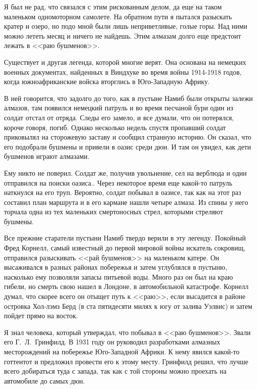 \documentclass[12pt,a4paper,twoside,openany,svgnames]{memoir}
\begin{document}
Я был не рад, что связался с этим рискованным делом, да еще на таком маленьком одномоторном самолете. На обратном пути я пытался разыскать кратер и озеро, но подо мной были лишь неприветливые, голые горы. Над ними можно лететь месяц и ничего не найдешь. Этим алмазам долго еще предстоит лежать в <<раю бушменов>>.

Существует и другая легенда, которой многие верят. Она основана на немецких военных документах, найденных в Виндхуке во время войны 1914-1918 годов, когда южноафриканские войска вторглись в Юго-Западную Африку.

В ней говорится, что задолго до того, как в пустыне Намиб были открыты залежи алмазов, там появился немецкий патруль и во время песчаной бури один из солдат отстал от отряда. Следы его замело, и все думали, что он потерялся, короче говоря, погиб. Однако несколько недель спустя пропавший солдат приковылял на сторожевую заставу и сообщил странную историю. Он сказал, что его подобрали бушмены и привели в оазис среди дюн. И там он увидел, как дети бушменов играют алмазами.

Ему никто не поверил. Солдат же, получив увольнение, сел на верблюда и один отправился на поиски оазиса.. Через некоторое время еще какой-то патруль наткнулся на его труп. Вероятно, солдат побывал в оазисе, так как на этот раз составил план маршрута и в его кармане нашли четыре алмаза. Из спины у него торчала одна из тех маленьких смертоносных стрел, которыми стреляют бушмены.

Все прежние старатели пустыни Намиб твердо верили в эту легенду. Покойный Фред Корнелл, самый известный до первой мировой войны искатель сокровищ, отправился разыскивать <<рай бушменов>> на маленьком катере. Он высаживался в разных районах побережья и затем углублялся в пустыню, насколько ему позволяли запасы питьевой воды. Много раз он был на краю гибели, но смерть свою нашел в Лондоне, в автомобильной катастрофе. Корнелл думал, что скорее всего он отыщет путь к <<раю>>, если высадится в районе островка Хол-лэмз Берд (в ста пятидесяти милях к югу от залива Уэлвис) и затем пойдет прямо на восток.

Я знал человека, который утверждал, что побывал в <<раю бушменов>>. Звали его Г.~Л.~Гринфилд. В 1931 году он руководил разработками алмазных месторождений на побережье Юго-Западной Африки. К нему явился какой-то готтентот и предложил провести его к этому месту. Гринфилд решил, что лучше всего добираться туда с запада, так как с той стороны можно проехать на автомобиле до самых дюн.
\end{document}
